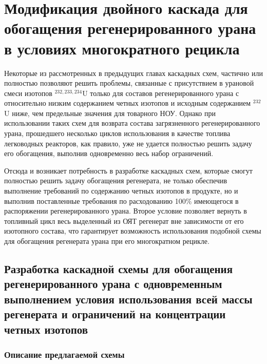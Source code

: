 \chapter{Модификация двойного каскада для обогащения регенерированного урана в условиях многократного рецикла}\label{ch:ch3}

Некоторые из рассмотренных в предыдущих главах каскадных схем, частично или полностью позволяют решить проблемы, связанные с присутствием в урановой смеси изотопов $^{232,233,234}$U только для составов регенерированного урана с относительно низким содержанием четных изотопов и исходным содержанием $^{232}$U ниже, чем предельные значения для товарного НОУ. Однако при использовании таких схем для возврата состава загрязненного регенерированного урана, прошедшего несколько циклов использования в качестве топлива легководных реакторов, как правило, уже не удается полностью решить задачу его обогащения, выполнив одновременно весь набор ограничений.

Отсюда и возникает потребность в разработке каскадных схем, которые смогут полностью решить задачу обогащения регенерата, не только обеспечив выполнение требований по содержанию четных изотопов в продукте, но и выполнив поставленные требования по расходованию 100\% имеющегося в распоряжении регенерированного урана. Второе условие позволяет вернуть в топливный цикл весь выделенный из ОЯТ регенерат вне зависимости от его изотопного состава, что гарантирует возможность использования подобной схемы для обогащения регенерата урана при его многократном рецикле.

\section{Разработка каскадной схемы для обогащения регенерированного урана с одновременным выполнением условия использования всей массы регенерата и ограничений на концентрации четных изотопов}
\subsection{Описание предлагаемой схемы}

